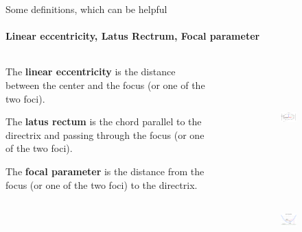 \documentclass[aspectratio=169]{beamer}
\begin{document}
\begin{frame}[t]{Some definitions, which can be helpful}
\framesubtitle{Linear eccentricity, Latus Rectrum, Focal parameter}
    \begin{columns}[T,onlytextwidth]
        \begin{column}{0.59\textwidth}
            The \textbf{linear eccentricity} is the distance between the center and the focus (or one of the two foci). \medskip 
            
            The \textbf{latus rectum} is the chord parallel to the directrix and passing through the focus (or one of the two foci). \medskip 
            
            The \textbf{focal parameter} is the distance from the focus (or one of the two foci) to the directrix.

        \end{column}
        \begin{column}{0.39\textwidth}
            \vspace{-1cm}
            \begin{figure}[H]
                \begin{subfigure}{0.99\textwidth}
                    \centering\includegraphics[height=4cm,width=1\textwidth,keepaspectratio]{ellipse_focal.png}
                    \label{fig:ellipse_focal.png}
                \end{subfigure}

                \begin{subfigure}{0.99\textwidth}
                    \vspace{-0.6cm}
                    \centering\includegraphics[height=3cm,width=1\textwidth,keepaspectratio]{parabola_focus.png}
                    \label{fig:parabola_focus.png}
                \end{subfigure}
            \end{figure}
        \end{column}
    \end{columns}
\end{frame}
\end{document}
